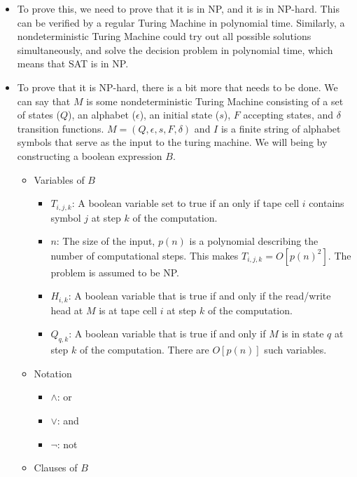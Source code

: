 \documentclass{article}
\begin{document}
\begin{itemize}
\begin{itemize}
        \item To prove this, we need to prove that it is in NP, and it is in NP-hard. This can be verified by a regular Turing Machine in polynomial time. Similarly, a nondeterministic Turing Machine could try out all possible solutions simultaneously, and solve the decision problem in polynomial time, which means that SAT is in NP.
        \item To prove that it is NP-hard, there is a bit more that needs to be done. We can say that \(M\) is some nondeterministic Turing Machine consisting of a set of states (\(Q\)), an alphabet (\(\epsilon\)), an initial state (\(s\)), \(F\) accepting states, and \(\delta\) transition functions. \(M=(Q,\epsilon,s,F,\delta)\) and \(I\) is a finite string of alphabet symbols that serve as the input to the turing machine. We will being by constructing a boolean expression \(B\).
        \begin{itemize}
            \item Variables of \(B\)
            \begin{itemize}
                \item \(T_{i,j,k}\): A boolean variable set to true if an only if tape cell \(i\) contains symbol \(j\) at step \(k\) of the computation.
                \item \(n\): The size of the input, \(p(n)\) is a polynomial describing the number of computational steps. This makes \(T_{i,j,k}=O[p(n)^2]\). The problem is assumed to be NP.
                \item \(H_{i,k}\): A boolean variable that is true if and only if the read/write head at \(M\) is at tape cell \(i\) at step \(k\) of the computation.
                \item \(Q_{q,k}\): A boolean variable that is true if and only if \(M\) is in state \(q\) at step \(k\) of the computation. There are \(O[p(n)]\) such variables.
            \end{itemize}
            \item Notation
            \begin{itemize}
                \item \(\wedge\): or
                \item \(\lor\): and
                \item \(\neg\): not
            \end{itemize}
            \item Clauses of \(B\)
            \begin{itemize}

\end{itemize}
\end{itemize}
\end{itemize}
\end{itemize}
\end{document}
